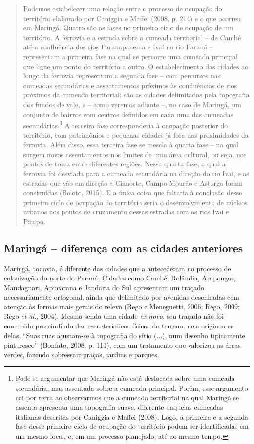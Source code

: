 \documentclass[12pt, a4paper]{book} %
\begin{document}
        \begin{quotation}
            Podemos estabelecer uma relação entre o processo de ocupação do território elaborado por Caniggia e Maffei (2008, p. 214) e o que ocorreu em Maringá. Quatro são as fases no primeiro ciclo de ocupação de um território. A ferrovia e a estrada sobre a cumeada territorial – de Cambé até a confluência dos rios Paranapanema e Ivaí no rio Paraná – representam a primeira fase na qual se percorre uma cumeada principal que ligue um ponto do território a outro. O estabelecimento das cidades ao longo da ferrovia representam a segunda fase – com percursos nas cumeadas secundárias e assentamentos próximos às confluências de rios próximos da cumeada territorial; são as cidades delimitadas pela topografia dos fundos de vale, e – como veremos adiante –, no caso de Maringá, um conjunto de bairros com centros definidos em cada uma das cumeadas secundárias.\footnote[0]{Pode-se argumentar que Maringá não está deslocada sobre uma cumeada secundária, mas assentada sobre a cumeada principal. Porém, esse argumento cai por terra ao observarmos que a cumeada territorial na qual Maringá se assenta apresenta uma topografia suave, diferente daquelas cumeadas italianas descritas por Caniggia e Maffei (2008). Logo, a primeira e a segunda fase desse primeiro ciclo de ocupação do território podem ser identificadas em um mesmo local, e, em um processo planejado, até ao mesmo tempo.} A terceira fase corresponderia à ocupação posterior do território, com patrimônios e pequenas cidades já fora das proximidades da ferrovia. Além disso, essa terceira fase se mescla à quarta fase – na qual surgem novos assentamentos nos limites de uma área cultural, ou seja, nos pontos de troca entre diferentes regiões. Nessa quarta fase, a qual a ferrovia foi desviada para a cumeada secundária na direção do rio Ivaí, e as estradas que vão em direção a Cianorte, Campo Mourão e Astorga foram construídas (Beloto, 2015). E a única coisa que faltaria à conclusão desse primeiro ciclo de ocupação do território seria o desenvolvimento de núcleos urbanos nos pontos de cruzamento dessas estradas com os rios Ivaí e Pirapó.
        \end{quotation}

                \subsection*{Maringá – diferença com as cidades anteriores}

        
        Maringá, todavia, é diferente das cidades que a antecederam no processo de colonização do norte do Paraná. Cidades como Cambé, Rolândia, Arapongas, Mandaguari, Apucarana e Jandaria do Sul apresentam um traçado necessariamente ortogonal, ainda que delimitado por avenidas desenhadas com atenção às formas mais gerais do relevo (Rego e Meneguetti, 2006; Rego, 2009; Rego \textit{et al.}, 2004). Mesmo sendo uma cidade \textit{ex novo}, seu traçado não foi concebido prescindindo das características físicas do terreno, mas originou-se delas. ``Suas ruas ajustam-se à topografia do sítio (...), num desenho tipicamente pinturesco'' (Bonfato, 2008, p. 111), com um tratamento que valorizou as áreas verdes, fazendo sobressair praças, jardins e parques. 
        
\end{document}
